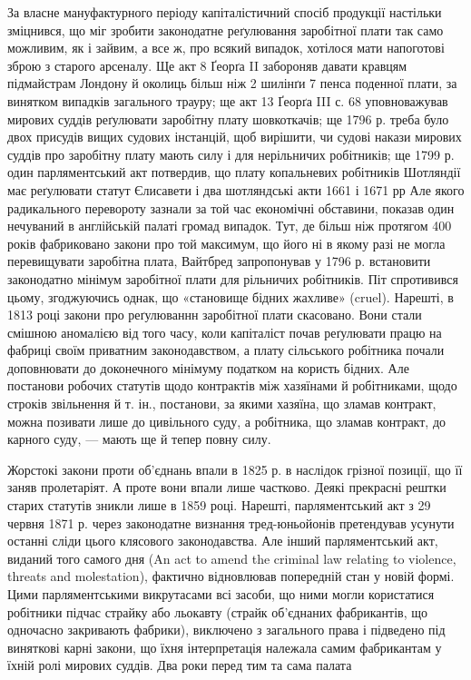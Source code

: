 За власне мануфактурного періоду капіталістичний спосіб
продукції настільки зміцнився, що міг зробити законодатне
реґулювання заробітної плати так само можливим, як і зайвим,
а все ж, про всякий випадок, хотілося мати напоготові зброю
з старого арсеналу. Ще акт 8 Ґеорґа II забороняв давати кравцям
підмайстрам Лондону й околиць більш ніж 2 шилінґи 7 пенса
поденної плати, за винятком випадків загального трауру; ще
\parbreak{}
\parcont{}
акт 13 Ґеорґа III с. 68 уповноважував мирових суддів реґулювати
заробітну плату шовкоткачів; ще 1796 р. треба було двох
присудів вищих судових інстанцій, щоб вирішити, чи судові
накази мирових суддів про заробітну плату мають силу і для
нерільничих робітників; ще 1799 р. один парляментський акт
потвердив, що плату копальневих робітників Шотляндії має
реґулювати статут Єлисавети і два шотляндські акти 1661 і 1671 рр
Але якого радикального перевороту зазнали за той час економічні
обставини, показав один нечуваний в англійській палаті
громад випадок. Тут, де більш ніж протягом 400 років фабриковано
закони про той максимум, що його ні в якому разі не
могла перевищувати заробітна плата, Вайтбред запропонував
у 1796 р. встановити законодатно мінімум заробітної плати для
рільничих робітників. Піт спротивився цьому, згоджуючись
однак, що «становище бідних жахливе» (cruel). Нарешті, в
1813 році закони про реґулюваннн заробітної плати скасовано.
Вони стали смішною аномалією від того часу, коли капіталіст
почав реґулювати працю на фабриці своїм приватним законодавством,
а плату сільського робітника почали доповнювати до доконечного
мінімуму податком на користь бідних. Але постанови
робочих статутів щодо контрактів між хазяїнами й робітниками,
щодо строків звільнення й т. ін., постанови, за якими хазяїна,
що зламав контракт, можна позивати лише до цивільного суду,
а робітника, що зламав контракт, до карного суду, — мають ще
й тепер повну силу.

Жорстокі закони проти об’єднань впали в 1825 р. в наслідок
грізної позиції, що її заняв пролетаріят. А проте вони впали
лише частково. Деякі прекрасні рештки старих статутів зникли
лише в 1859 році. Нарешті, парляментський акт з 29 червня
1871 р. через законодатне визнання тред-юньойонів претендував
усунути останні сліди цього клясового законодавства. Але
інший парляментський акт, виданий того самого дня (An act
to amend the criminal law relating to violence, threats and molestation),
фактично відновлював попередній стан у новій формі.
Цими парляментськими викрутасами всі засоби, що ними могли
користатися робітники підчас страйку або льокавту (страйк
об’єднаних фабрикантів, що одночасно закривають фабрики),
виключено з загального права і підведено під виняткові карні
закони, що їхня інтерпретація належала самим фабрикантам
у їхній ролі мирових суддів. Два роки перед тим та сама палата
\parbreak{}  %
